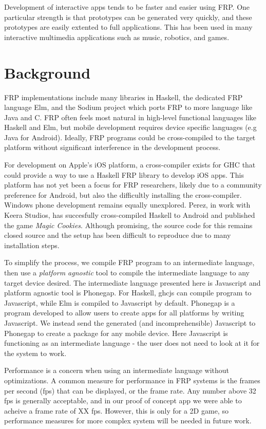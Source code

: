 \documentclass{sigplanconf}
\begin{document}

Development of interactive apps tends to be faster and easier using FRP.
One particular strength is that prototypes can be generated very quickly, and these prototypes are easily extented to full applications.
This has been used in many interactive multimedia applications such as music, robotics, and games\cite{}.

\section{Background}
FRP implementations include many libraries in Haskell, the dedicated FRP language Elm, and the Sodium project which ports FRP to more language like Java and C.
FRP often feels most natural in high-level functional languages like Haskell and Elm, but mobile development requires device specific languages (e.g Java for Android).
Ideally, FRP programs could be cross-compiled to the target platform without significant interference in the development process.

For development on Apple's iOS platform, a cross-compiler exists for GHC that could provide a way to use a Haskell FRP library to develop iOS apps.
This platform has not yet been a focus for FRP researchers, likely due to a community preference for Android, but also the difficultly installing the cross-compiler.
Windows phone development remains equally unexplored.
Perez, in work with Keera Studios, has succesfully cross-compiled Haskell to Android and published the game \textit{Magic Cookies}\cite{}.
Although promising, the source code for this remains closed source and the setup has been difficult to reproduce due to many installation steps.

To simplify the process, we compile FRP program to an intermediate language, then use a \textit{platform agnostic} tool to compile the intermediate language to any target device desired.
The intermediate language presented here is Javascript and platform agnostic tool is Phonegap.
For Haskell, ghcjs can compile program to Javascript, while Elm is compiled to Javascript by default.
Phonegap is a program developed to allow users to create apps for all platforms by writing Javascript. 
We instead send the generated (and incomprehensible) Javascript to Phonegap to create a package for any mobile device.
Here Javascript is functioning as an intermediate language - the user does not need to look at it for the system to work.

Performance is a concern when using an intermediate language without optimizations. 
A common measure for performance in FRP systems is the frames per second (fps) that can be displayed, or the frame rate.
Any number above 32 fps is generally acceptable, and in our proof of concept app we were able to acheive a frame rate of XX fps.
However, this is only for a 2D game, so performance measures for more complex system will be needed in future work.
\end{document}
